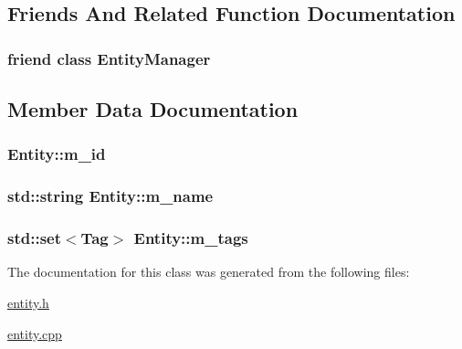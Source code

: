 \subsection{Friends And Related Function Documentation}
\hypertarget{classEntity_a6f579cda6059d102e9074e11a27e0282}{
\subsubsection[{Entity\-Manager}]{\setlength{\rightskip}{0pt plus 5cm}friend class {\bf Entity\-Manager}\hspace{0.3cm}{\ttfamily [friend]}}}\label{classEntity_a6f579cda6059d102e9074e11a27e0282}


\subsection{Member Data Documentation}
\hypertarget{classEntity_a3dd68bb3258dd9ed2c878712b08a523b}{
\subsubsection[{m\-\_\-id}]{ Entity\-::m\-\_\-id\hspace{0.3cm}{\ttfamily [private]}}}\label{classEntity_a3dd68bb3258dd9ed2c878712b08a523b}
\hypertarget{classEntity_a4b945ebe36bda22cc9cc7c6620f43d51}{
\subsubsection[{m\-\_\-name}]{\setlength{\rightskip}{0pt plus 5cm}std\-::string Entity\-::m\-\_\-name\hspace{0.3cm}{\ttfamily [private]}}}\label{classEntity_a4b945ebe36bda22cc9cc7c6620f43d51}
\hypertarget{classEntity_afb554fadb21bb5bc9cf51633373a387a}{
\subsubsection[{m\-\_\-tags}]{\setlength{\rightskip}{0pt plus 5cm}std\-::set$<${\bf Tag}$>$ Entity\-::m\-\_\-tags\hspace{0.3cm}{\ttfamily [private]}}}\label{classEntity_afb554fadb21bb5bc9cf51633373a387a}


The documentation for this class was generated from the following files\-:\begin{DoxyCompactItemize}
\item 
\hyperlink{entity_8h}{entity.\-h}\item 
\hyperlink{entity_8cpp}{entity.\-cpp}\end{DoxyCompactItemize}
